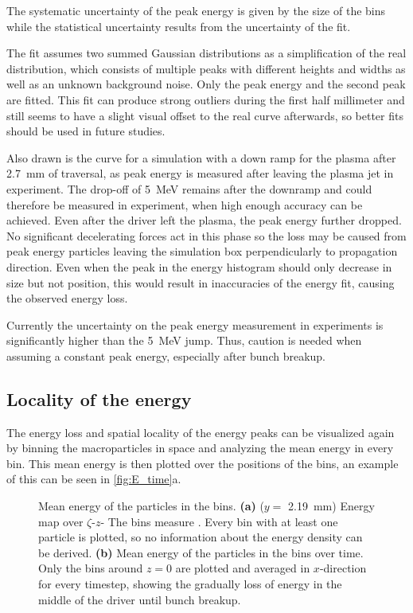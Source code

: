\documentclass[bachelor_thesis]{subfiles}
\begin{document}
The systematic uncertainty of the peak energy is given by the size of the bins while the statistical uncertainty results from the uncertainty of the fit. 

The fit assumes two summed Gaussian distributions as a simplification of the real distribution, which consists of multiple peaks with different heights and widths as well as an unknown background noise. Only the peak energy and the second peak are fitted.
This fit can produce strong outliers during the first half millimeter and still seems to have a slight visual offset to the real curve afterwards, so better fits should be used in future studies.

Also drawn is the curve for a simulation with a down ramp for the plasma after \qty{2.7}{\mm} of traversal, as peak energy is measured after leaving the plasma jet in experiment. The drop-off of \qty{5}{\MeV} remains after 
the downramp and could therefore be measured in experiment, when high enough accuracy can be achieved. Even after the driver left the plasma, the peak energy further dropped. No significant decelerating forces act in this phase so the loss may be caused
from peak energy particles leaving the simulation box perpendicularly to propagation direction. Even when the peak in the energy histogram should only decrease in size but not position, this would result in inaccuracies of the energy fit,
causing the observed energy loss.

Currently the uncertainty on the peak energy measurement in experiments is significantly higher than the \qty{5}{\MeV} jump. Thus, caution is needed when assuming a constant peak energy, especially after bunch breakup.

\subsection{Locality of the energy}\label{chap:loc_E}
The energy loss and spatial locality of the energy peaks can be visualized again by binning the macroparticles in space and analyzing the mean energy in every bin. This mean energy is then plotted over the positions of the bins,
an example of this can be seen in \autoref{fig:E_time}a. 
\begin{figure}
	\centering
	
	\caption{Mean energy of the particles in the bins.
	\textbf{(a)} ($y=$ \qty{2.19}{mm}) Energy map over $\zeta$-$z$- The bins measure . Every bin with at least one particle is plotted, so no information about the energy density can be derived.
	\textbf{(b)} Mean energy of the particles in the bins over time. Only the bins around $z=0$ are plotted and averaged in $x$-direction for every timestep, showing the gradually loss of energy in the middle of the driver until bunch breakup.}
	\label{fig:E_time}
\end{figure}
\end{document}
